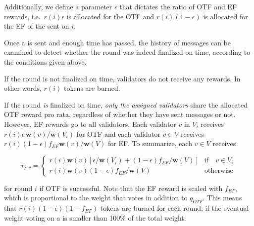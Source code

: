 Additionally, we define a parameter $\epsilon$ that dictates the ratio of OTF and EF rewards, i.e.~$r(i)\epsilon$ is allocated for the OTF and $r(i)(1-\epsilon)$ is allocated for the EF of the \PROP sent on $i$.

Once a \PROP is sent and enough time has passed, the history of messages can be examined to detect whether the round was indeed finalized on time, according to the conditions given above.

If the round is not finalized on time, validators do not receive any rewards. In other words, $r(i)$ tokens are burned.

If the round \emph{is} finalized on time, \emph{only the assigned validators} share the allocated OTF reward pro rata, regardless of whether they have sent messages or not. However, EF rewards go to all validators. Each validator $v$ in $V_i$ receives $r(i)\epsilon \,\boldsymbol{w}(v)/\boldsymbol{w}(V_i)$ for OTF and each validator $v\in V$ receives $r(i)(1-\epsilon)f_{EF}\boldsymbol{w}(v)/\boldsymbol{w}(V)$ for EF. To summarize, each $v\in V$ receives

\begin{equation}
  r_{i,v} = \begin{cases} r(i)\boldsymbol{w}(v)[\epsilon/\boldsymbol{w}(V_i) + (1-\epsilon)f_{EF}/\boldsymbol{w}(V)] &\text{if}\quad v\in V_i\\
    r(i)\boldsymbol{w}(v)(1-\epsilon)f_{EF}/\boldsymbol{w}(V) & \text{otherwise}
  \end{cases}
\end{equation}

for round $i$ if OTF is successful. Note that the EF reward is scaled with $f_{EF}$, which is proportional to the weight that votes in addition to $q_{OTF}$. This means that $r(i)(1-\epsilon)(1-f_{EF})$ tokens are burned for each round, if the eventual weight voting on a \PROP is smaller than 100\% of the total weight.



